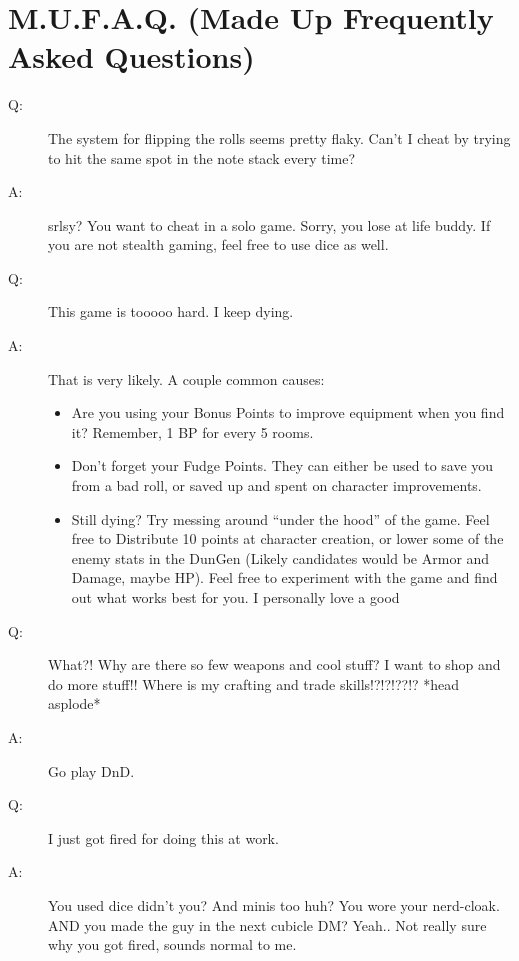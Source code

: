 \documentclass[a6paper,hidelinks]{article}
\begin{document}
\section{M.U.F.A.Q. (Made Up Frequently Asked Questions)}

\begin{description}
\item[Q:]  The system for flipping the rolls seems pretty flaky. Can't I cheat by trying to hit the same spot in the note stack every time?
\item[A:]  srlsy? You want to cheat in a solo game. Sorry, you lose at life buddy. If you are not stealth gaming, feel free to use dice as well.
\end{description}

\begin{description}
\item[Q:]  This game is tooooo hard. I keep dying.
\item[A:]  That is very likely. A couple common causes:
\begin{itemize}

\item Are you using your Bonus Points to improve equipment when you find it? Remember, 1 BP for every 5 rooms.

\item Don't forget your Fudge Points. They can either be used to save you from a bad roll, or saved up and spent on character improvements.

\item Still dying? Try messing around ``under the hood''  of the game. Feel free to Distribute 10 points at character creation, or lower some of the
enemy stats in the DunGen (Likely candidates would be Armor and Damage, maybe HP). Feel free to experiment with the game and find out what works best for you. I personally love a good
\end{itemize}

\end{description}

\begin{description}
\item[Q:]  What?! Why are there so few weapons and cool stuff? I want to shop and do more stuff!! Where is my crafting and trade skills!?!?!??!? *head asplode*
\item[A:] Go play DnD.
\end{description}

\begin{description}

\item[Q:]  I just got fired for doing this at work.
\item[A:]   You used dice didn't you? And minis too huh? You wore your nerd-cloak. AND you made the guy in the next cubicle DM? Yeah.. Not really sure why you got fired, sounds normal to me.
\end{description}
\end{document}
